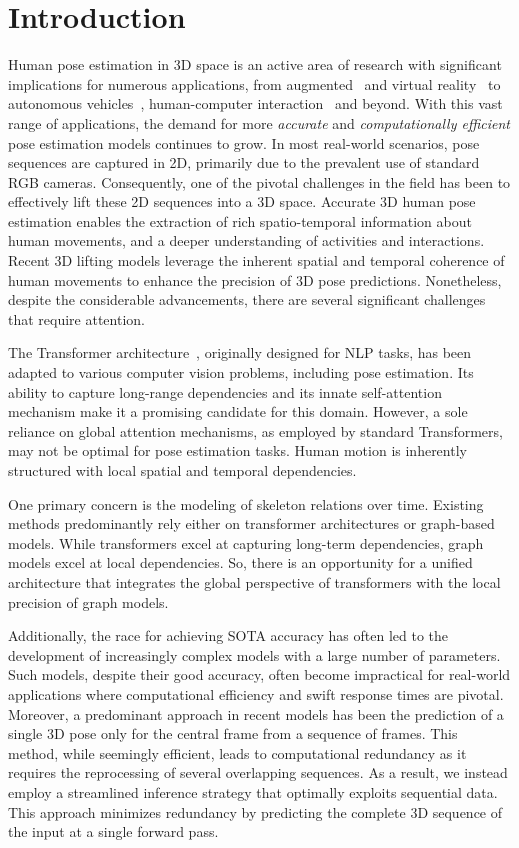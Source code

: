 \documentclass[10pt,twocolumn,letterpaper]{article}
\begin{document}
\section{Introduction}
\label{sec:intro}

Human pose estimation in 3D space is an active area of research with significant implications for numerous applications, from augmented~\cite{lin2010augmented} and virtual reality~\cite{mehta2017vnect} to autonomous vehicles~\cite{wiederer2020traffic, czech2022board, bauer2023weakly}, human-computer interaction~\cite{munea2020progress} and beyond. With this vast range of applications, the demand for more \textit{accurate} and \textit{computationally efficient} pose estimation models continues to grow. In most real-world scenarios, pose sequences are captured in 2D, primarily due to the prevalent use of standard RGB cameras. Consequently, one of the pivotal challenges in the field has been to effectively lift these 2D sequences into a 3D space. Accurate 3D human pose estimation enables the extraction of rich spatio-temporal information about human movements, and a deeper understanding of activities and interactions.
Recent 3D lifting models leverage the inherent spatial and temporal coherence of human movements to enhance the precision of 3D pose predictions. Nonetheless, despite the considerable advancements, there are several significant challenges that require attention.

The Transformer architecture~\cite{vaswani2017attention}, 
originally designed for NLP tasks, has been adapted to various computer vision problems, including pose estimation. Its ability to capture long-range dependencies and its innate self-attention mechanism make it a promising candidate for this domain. However, a sole reliance on global attention mechanisms, as employed by standard Transformers, may not be optimal for pose estimation tasks. Human motion is inherently structured with local spatial and temporal dependencies.

One primary concern is the modeling of skeleton relations over time. Existing methods predominantly rely either on transformer architectures or graph-based models. While transformers excel at capturing long-term dependencies, graph models excel at local dependencies. So, there is an opportunity for a unified architecture that integrates the global perspective of transformers with the local precision of graph models.

Additionally, the race for achieving SOTA accuracy has often led to the development of increasingly complex models with a large number of parameters. Such models, despite their good accuracy, often become impractical for real-world applications where computational efficiency and swift response times are pivotal.
Moreover, a predominant approach in recent models has been the prediction of a single 3D pose only for the central frame from a sequence of frames. This method, while seemingly efficient, leads to computational redundancy as it requires the reprocessing of several overlapping sequences. As a result, we instead employ a streamlined inference strategy that optimally exploits sequential data. This approach minimizes redundancy by predicting the complete 3D sequence of the input at a single forward pass.
\end{document}
